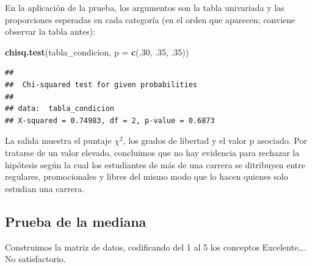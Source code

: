 \documentclass[]{book}
\newenvironment{Shaded}{\begin{snugshade}}{\end{snugshade}}
\newcommand{\DataTypeTok}[1]{\textcolor[rgb]{0.13,0.29,0.53}{#1}}
\newcommand{\DecValTok}[1]{\textcolor[rgb]{0.00,0.00,0.81}{#1}}
\newcommand{\FloatTok}[1]{\textcolor[rgb]{0.00,0.00,0.81}{#1}}
\newcommand{\KeywordTok}[1]{\textcolor[rgb]{0.13,0.29,0.53}{\textbf{#1}}}
\newcommand{\NormalTok}[1]{#1}
\begin{document}
En la aplicación de la prueba, los argumentos son la tabla univariada y las proporciones esperadas en cada categoría (en el orden que aparecen; conviene observar la tabla antes):

\begin{Shaded}
\begin{Highlighting}[]
\KeywordTok{chisq.test}\NormalTok{(tabla_condicion, }\DataTypeTok{p =} \KeywordTok{c}\NormalTok{(.}\DecValTok{30}\NormalTok{, }\FloatTok{.35}\NormalTok{, }\FloatTok{.35}\NormalTok{))}
\end{Highlighting}
\end{Shaded}

\begin{verbatim}
## 
##  Chi-squared test for given probabilities
## 
## data:  tabla_condicion
## X-squared = 0.74983, df = 2, p-value = 0.6873
\end{verbatim}

La salida muestra el puntaje \(\chi^2\), los grados de libertad y el valor p asociado. Por tratarse de un valor elevado, concluimos que no hay evidencia para rechazar la hipótesis según la cual los estudiantes de más de una carrera se ditribuyen entre regulares, promocionales y libres del mismo modo que lo hacen quienes solo estudian una carrera.

\hypertarget{prueba-de-la-mediana-1}{%
\subsection{Prueba de la mediana}\label{prueba-de-la-mediana-1}}

Construimos la matriz de datos, codificando del 1 al 5 los conceptos Excelente\ldots{}. No satisfactorio.
\end{document}
